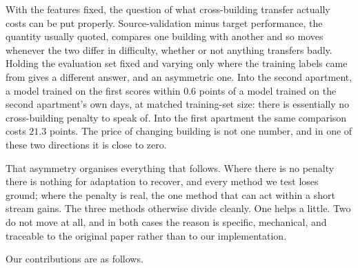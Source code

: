 \documentclass[a4paper,fleqn]{cas-dc}
\begin{document}
With the features fixed, the question of what cross-building transfer actually costs can
be put properly. Source-validation minus target performance, the quantity usually quoted,
compares one building with another and so moves whenever the two differ in difficulty,
whether or not anything transfers badly. Holding the evaluation set fixed and varying only
where the training labels came from gives a different answer, and an asymmetric one. Into
the second apartment, a model trained on the first scores within $0.6$ points of a model
trained on the second apartment's own days, at matched training-set size: there is
essentially no cross-building penalty to speak of. Into the first apartment the same
comparison costs $21.3$ points. The price of changing building is not one number, and in
one of these two directions it is close to zero.

That asymmetry organises everything that follows. Where there is no penalty there is
nothing for adaptation to recover, and every method we test loses ground; where the
penalty is real, the one method that can act within a short stream gains. The three
methods otherwise divide cleanly. One helps a little. Two do not move at all, and in both
cases the reason is specific, mechanical, and traceable to the original paper rather than
to our implementation.

Our contributions are as follows.
\end{document}
